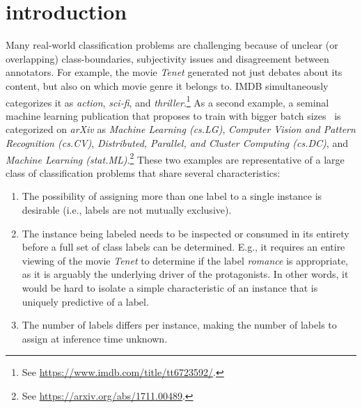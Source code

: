 
\section{introduction}
\label{sec:org662677c}


Many real-world classification problems are challenging because of unclear (or overlapping) class-boundaries, subjectivity issues and disagreement between annotators.
For example, the movie \textit{Tenet} generated not just debates about its content, but also on which movie genre it belongs to. IMDB simultaneously categorizes it as \textit{action}, \textit{sci-fi}, and \textit{thriller}.\footnote{See \url{https://www.imdb.com/title/tt6723592/}.}
As a second example, a seminal machine learning publication that proposes to train with bigger batch sizes~\citep{bigBSArxiv} is categorized on \textit{arXiv} as \textit{Machine Learning (cs.LG)},
\textit{Computer Vision and Pattern Recognition (cs.CV)}, \textit{Distributed,
Parallel, and Cluster Computing (cs.DC)}, and \textit{Machine Learning
(stat.ML)}.\footnote{See \url{https://arxiv.org/abs/1711.00489}.}
These two examples are representative of a large class of classification problems that share several characteristics:
\begin{enumerate}[label=(\arabic*),leftmargin=*]
\item The possibility of assigning more than one label to a single instance is desirable (i.e., labels are not mutually exclusive).
\item The instance being labeled needs to be inspected or consumed in its entirety before a full set of class labels can be determined. E.g., it requires an entire viewing of the movie \textit{Tenet} to determine if the label \textit{romance} is appropriate, as it is arguably the underlying driver of the protagonists. In other words, it would be hard to isolate a simple characteristic of an instance that is uniquely predictive of a label. 
\item The number of labels differs per instance, making the number of labels to assign at inference time unknown.
\end{enumerate}


